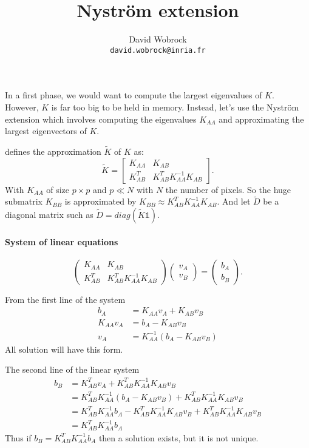\documentclass[]{article}
\title{Nystr\"om extension}
\author{David Wobrock\\ \texttt{david.wobrock@inria.fr}}
\begin{document}
\maketitle

In a first phase, we would want to compute the largest eigenvalues of \(K\).
However, \(K\) is far too big to be held in memory.
Instead, let's use the Nystr\"om extension which involves computing the eigenvalues \(K_{AA}\) and approximating the largest eigenvectors of \(K\).

\cite{glide_2014} defines the approximation \(\tilde{K}\) of \(K\) as:
\[\tilde{K} = \begin{bmatrix}
 K_{AA} & K_{AB} \\
 K_{AB}^T & K_{AB}^T K_{AA}^{-1} K_{AB}
\end{bmatrix}.\]
With \(K_{AA}\) of size \(p \times p\) and \(p \ll N\) with \(N\) the number of pixels.
So the huge submatrix \(K_{BB}\) is approximated by \(K_{BB} \approx K_{AB}^T K_{AA}^{-1} K_{AB}\).
And let \(\tilde{D}\) be a diagonal matrix such as \(\tilde{D} = diag(\tilde{K} \mathds1)\).

\paragraph{System of linear equations}
\[\begin{pmatrix}
 K_{AA} & K_{AB} \\
 K_{AB}^T & K_{AB}^T K_{AA}^{-1} K_{AB}
\end{pmatrix}
\begin{pmatrix}
 v_A \\
 v_B
\end{pmatrix} = 
\begin{pmatrix}
 b_A \\
 b_B
\end{pmatrix}.\]

From the first line of the system
\begin{equation}
 \begin{split}
   b_A & = K_{AA} v_A + K_{AB} v_B \\
   K_{AA} v_A & = b_A - K_{AB} v_B \\
   v_A & = K_{AA}^{-1}(b_A - K_{AB} v_B)
 \end{split}
\end{equation}
All solution will have this form.

The second line of the linear system
\begin{equation}
 \begin{split}
  b_B & = K_{AB}^T v_A + K_{AB}^T K_{AA}^{-1} K_{AB} v_B \\
  & = K_{AB}^T K_{AA}^{-1}(b_A - K_{AB} v_B) + K_{AB}^T K_{AA}^{-1} K_{AB} v_B \\
  & = K_{AB}^T K_{AA}^{-1} b_A - K_{AB}^T K_{AA}^{-1} K_{AB} v_B + K_{AB}^T K_{AA}^{-1} K_{AB} v_B \\
  & = K_{AB}^T K_{AA}^{-1} b_A
 \end{split}
\end{equation}
Thus if \(b_B = K_{AB}^T K_{AA}^{-1} b_A\) then a solution exists, but it is not unique.
\end{document}

